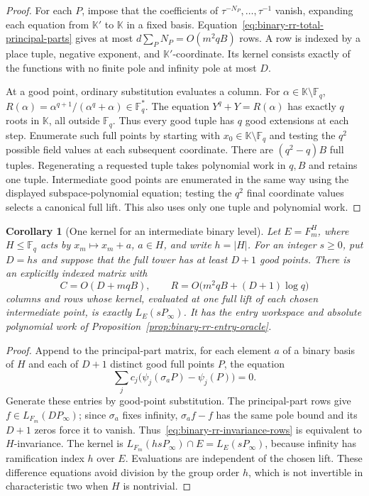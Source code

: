 \documentclass[11pt,letterpaper]{article}
\newtheorem{corollary}[theorem]{Corollary}
\numberwithin{equation}{section}
\begin{document}
\begin{proof}
For each $P$, impose that the coefficients of $\tau^{-N_P},\ldots,\tau^{-1}$ vanish, expanding each equation from $\mathbb K'$ to $\mathbb K$ in a fixed basis.
Equation~\eqref{eq:binary-rr-total-principal-parts} gives at most $d\sum_P N_P=O(m^2qB)$ rows.
A row is indexed by a place tuple, negative exponent, and $\mathbb K'$-coordinate.
Its kernel consists exactly of the functions with no finite pole and infinity pole at most $D$.

At a good point, ordinary substitution evaluates a column.
For $\alpha\in \mathbb K\setminus\mathbb F_q$, $R(\alpha)=\alpha^{q+1}/(\alpha^q+\alpha)\in\mathbb F_q^*$.
The equation $Y^q+Y=R(\alpha)$ has exactly $q$ roots in $\mathbb K$, all outside $\mathbb F_q$.
Thus every good tuple has $q$ good extensions at each step.
Enumerate such full points by starting with $x_0\in \mathbb K\setminus\mathbb F_q$ and testing the $q^2$ possible field values at each subsequent coordinate.
There are $(q^2-q)B$ full tuples.
Regenerating a requested tuple takes polynomial work in $q,B$ and retains one tuple.
Intermediate good points are enumerated in the same way using the displayed subspace-polynomial equation; testing the $q^2$ final coordinate values selects a canonical full lift.
This also uses only one tuple and polynomial work.
\end{proof}

\begin{corollary}[One kernel for an intermediate binary level]
\label{cor:binary-rr-invariant-kernel}
Let $E=F_m^H$, where $H\leq\mathbb F_q$ acts by $x_m\mapsto x_m+a$, $a\in H$, and write $h=|H|$.
For an integer $s\geq0$, put $D=hs$ and suppose that the full tower has at least $D+1$ good points.
There is an explicitly indexed matrix with
\[
 C=O(D+mqB),\qquad R=O\bigl(m^2qB+(D+1)\log q\bigr)
\]
columns and rows whose kernel, evaluated at one full lift of each chosen intermediate point, is exactly $L_E(sP_\infty)$.
It has the entry workspace and absolute polynomial work of Proposition~\ref{prop:binary-rr-entry-oracle}.
\end{corollary}

\begin{proof}
Append to the principal-part matrix, for each element $a$ of a binary basis of $H$ and each of $D+1$ distinct good full points $P$, the equation
\begin{equation}
 \sum_j c_j\bigl(\psi_j(\sigma_aP)-\psi_j(P)\bigr)=0.
 \label{eq:binary-rr-invariance-rows}
\end{equation}
Generate these entries by good-point substitution.
The principal-part rows give $f\in L_{F_m}(DP_\infty)$; since $\sigma_a$ fixes infinity, $\sigma_af-f$ has the same pole bound and its $D+1$ zeros force it to vanish.
Thus~\eqref{eq:binary-rr-invariance-rows} is equivalent to $H$-invariance.
The kernel is $L_{F_m}(hsP_\infty)\cap E=L_E(sP_\infty)$, because infinity has ramification index $h$ over $E$.
Evaluations are independent of the chosen lift.
These difference equations avoid division by the group order $h$, which is not invertible in characteristic two when $H$ is nontrivial.
\end{proof}
\end{document}
